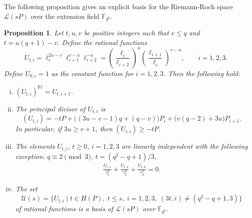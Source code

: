 \documentclass[a4paper]{amsart}
\theoremstyle{plain}
\newtheorem{proposition}[theorem]{Proposition}
\theoremstyle{definition}
\theoremstyle{remark}
\newcommand{\Frob}{\mathrm{Fr}}
\begin{document}
The following proposition gives an explicit basis for the Riemann-Roch space $\mathscr{L}(sP)$ over the extension field $\mathbb{F}_{q^6}$.
\begin{proposition} \label{pr:Uti-props}
Let $t,u,v$ be positive integers such that $v\leq q$ and $t=u(q+1)-v$. Define the rational functions
\[U_{t,i} = \ell_i^{2u-v}\ell_{i+1}^{v-u}\ell_{i+2}^{-u} = \left(\frac{\ell_i}{\ell_{i+2}}\right)^u\left(\frac{\ell_{i+1}}{\ell_i}\right)^{v-u}, \qquad i=1,2,3.\]
Define $U_{0,i}=1$ as the constant function for $i=1,2,3$. Then the following hold:
\begin{enumerate}[(i)]
\item $(U_{t,i})^\Frob = U_{t,i+1}$. 
\item The principal divisor of $U_{t,i}$ is 
\[(U_{t,i}) = -tP + \big((3u-v-1)q+(q-v)\big) P_i + \big(v(q-2)+3u\big) P_{i+1}.\]
In particular, if $3u\geq v+1$, then $(U_{t,i}) \geq -tP$. 
\item The elements $U_{t,i}$, $t\geq 0$, $i=1,2,3$ are linearly independent with the following exception: $q\equiv 2 \pmod{3}$, $t=(q^2-q+1)/3$, 
\begin{align} \label{eq:U-lin-dep}
\frac{U_{t,1}}{\gamma_{1}^q} + \frac{U_{t,2}}{\gamma_{2}^q} + \frac{U_{t,3}}{\gamma_{3}^q} =0.
\end{align}
\item The set
\[\mathcal{U}(s) = \{U_{t,i} \mid t\in H(P), \; t\leq s, \; i=1,2,3, \; (3t,i) \neq (q^2-q+1,3)\}\]
of rational functions is a basis of $\mathscr{L}(sP)$ over $\mathbb{F}_{q^6}$. 
\end{enumerate}
\end{proposition}
\end{document}
